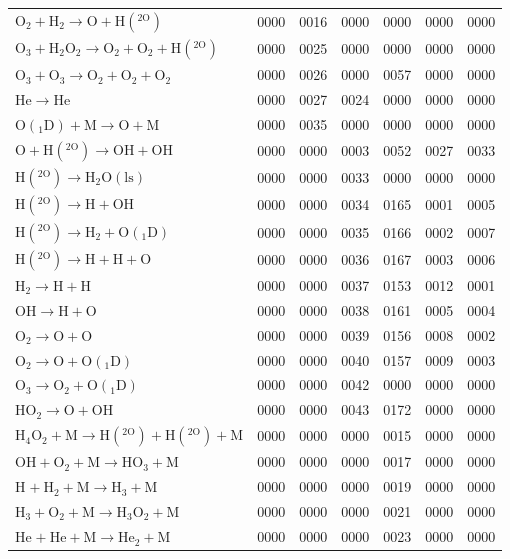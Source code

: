 \begin{longtable}{lrrrrrr}
$\mathrm{O_2 + H_2 \rightarrow O + H(^{2O})}$ & 0000 & 0016 & 0000 & 0000 & 0000 & 0000 \\
$\mathrm{O_3 + H_2O_2 \rightarrow O_2 + O_2 + H(^{2O})}$ & 0000 & 0025 & 0000 & 0000 & 0000 & 0000 \\
$\mathrm{O_3 + O_3 \rightarrow O_2 + O_2 + O_2}$ & 0000 & 0026 & 0000 & 0057 & 0000 & 0000 \\
$\mathrm{He \rightarrow He}$ & 0000 & 0027 & 0024 & 0000 & 0000 & 0000 \\
$\mathrm{O(_1D) + M \rightarrow O + M}$ & 0000 & 0035 & 0000 & 0000 & 0000 & 0000 \\
$\mathrm{O + H(^{2O}) \rightarrow OH + OH}$ & 0000 & 0000 & 0003 & 0052 & 0027 & 0033 \\
$\mathrm{H(^{2O}) \rightarrow H_2O(ls)}$ & 0000 & 0000 & 0033 & 0000 & 0000 & 0000 \\
$\mathrm{H(^{2O}) \rightarrow H + OH}$ & 0000 & 0000 & 0034 & 0165 & 0001 & 0005 \\
$\mathrm{H(^{2O}) \rightarrow H_2 + O(_1D)}$ & 0000 & 0000 & 0035 & 0166 & 0002 & 0007 \\
$\mathrm{H(^{2O}) \rightarrow H + H + O}$ & 0000 & 0000 & 0036 & 0167 & 0003 & 0006 \\
$\mathrm{H_2 \rightarrow H + H}$ & 0000 & 0000 & 0037 & 0153 & 0012 & 0001 \\
$\mathrm{OH \rightarrow H + O}$ & 0000 & 0000 & 0038 & 0161 & 0005 & 0004 \\
$\mathrm{O_2 \rightarrow O + O}$ & 0000 & 0000 & 0039 & 0156 & 0008 & 0002 \\
$\mathrm{O_2 \rightarrow O + O(_1D)}$ & 0000 & 0000 & 0040 & 0157 & 0009 & 0003 \\
$\mathrm{O_3 \rightarrow O_2 + O(_1D)}$ & 0000 & 0000 & 0042 & 0000 & 0000 & 0000 \\
$\mathrm{HO_2 \rightarrow O + OH}$ & 0000 & 0000 & 0043 & 0172 & 0000 & 0000 \\
$\mathrm{H_4O_2 + M \rightarrow H(^{2O}) + H(^{2O}) + M}$ & 0000 & 0000 & 0000 & 0015 & 0000 & 0000 \\
$\mathrm{OH + O_2 + M \rightarrow HO_3 + M}$ & 0000 & 0000 & 0000 & 0017 & 0000 & 0000 \\
$\mathrm{H^{} + H_2 + M \rightarrow H_3^{} + M}$ & 0000 & 0000 & 0000 & 0019 & 0000 & 0000 \\
$\mathrm{H_3^{} + O_2 + M \rightarrow H_3O_2^{} + M}$ & 0000 & 0000 & 0000 & 0021 & 0000 & 0000 \\
$\mathrm{He^{} + He + M \rightarrow He_2^{} + M}$ & 0000 & 0000 & 0000 & 0023 & 0000 & 0000 \\

\end{longtable}

